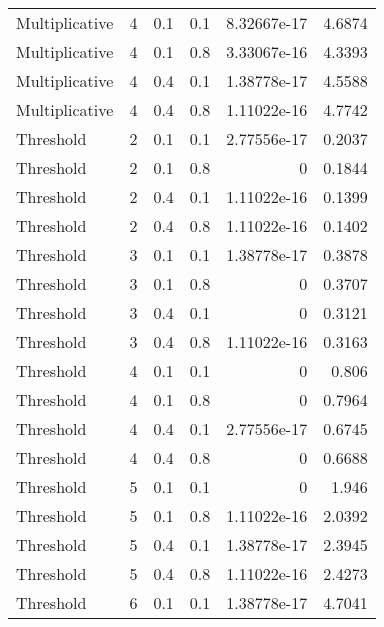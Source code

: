 \documentclass{article}
\begin{document}
\begin{figure}[H]
\begin{tabular}{lrrrrr}
 Multiplicative &       4 &   0.1 &            0.1 & 8.32667e-17 &            4.6874 \\
 Multiplicative &       4 &   0.1 &            0.8 & 3.33067e-16 &            4.3393 \\
 Multiplicative &       4 &   0.4 &            0.1 & 1.38778e-17 &            4.5588 \\
 Multiplicative &       4 &   0.4 &            0.8 & 1.11022e-16 &            4.7742 \\
 Threshold      &       2 &   0.1 &            0.1 & 2.77556e-17 &            0.2037 \\
 Threshold      &       2 &   0.1 &            0.8 & 0           &            0.1844 \\
 Threshold      &       2 &   0.4 &            0.1 & 1.11022e-16 &            0.1399 \\
 Threshold      &       2 &   0.4 &            0.8 & 1.11022e-16 &            0.1402 \\
 Threshold      &       3 &   0.1 &            0.1 & 1.38778e-17 &            0.3878 \\
 Threshold      &       3 &   0.1 &            0.8 & 0           &            0.3707 \\
 Threshold      &       3 &   0.4 &            0.1 & 0           &            0.3121 \\
 Threshold      &       3 &   0.4 &            0.8 & 1.11022e-16 &            0.3163 \\
 Threshold      &       4 &   0.1 &            0.1 & 0           &            0.806  \\
 Threshold      &       4 &   0.1 &            0.8 & 0           &            0.7964 \\
 Threshold      &       4 &   0.4 &            0.1 & 2.77556e-17 &            0.6745 \\
 Threshold      &       4 &   0.4 &            0.8 & 0           &            0.6688 \\
 Threshold      &       5 &   0.1 &            0.1 & 0           &            1.946  \\
 Threshold      &       5 &   0.1 &            0.8 & 1.11022e-16 &            2.0392 \\
 Threshold      &       5 &   0.4 &            0.1 & 1.38778e-17 &            2.3945 \\
 Threshold      &       5 &   0.4 &            0.8 & 1.11022e-16 &            2.4273 \\
 Threshold      &       6 &   0.1 &            0.1 & 1.38778e-17 &            4.7041 \\

\end{tabular}
\end{figure}
\end{document}
